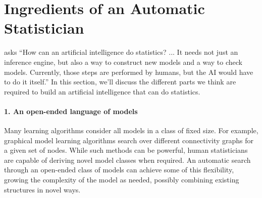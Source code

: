 

\section{Ingredients of an Automatic Statistician}
\label{sec:ingredients}
\citet{gelman2013philblogpost} asks ``How can an artificial intelligence do statistics? ... It needs not just an inference engine, but also a way to construct new models and a way to check models. Currently, those steps are performed by humans, but the AI would have to do it itself.''
%
In this section, we'll discuss the different parts we think are required to build an artificial intelligence that can do statistics.

\paragraph{1. An open-ended language of models}
Many learning algorithms consider all models in a class of fixed size.
For example, graphical model learning algorithms \citep{Friedman03,Eaton07_uai} search over different connectivity graphs for a given set of nodes.
While such methods can be powerful, human statisticians are capable of deriving novel model classes when required.
An automatic search through an open-ended class of models can achieve some of this flexibility, growing the complexity of the model as needed, possibly combining existing structures in novel ways.

